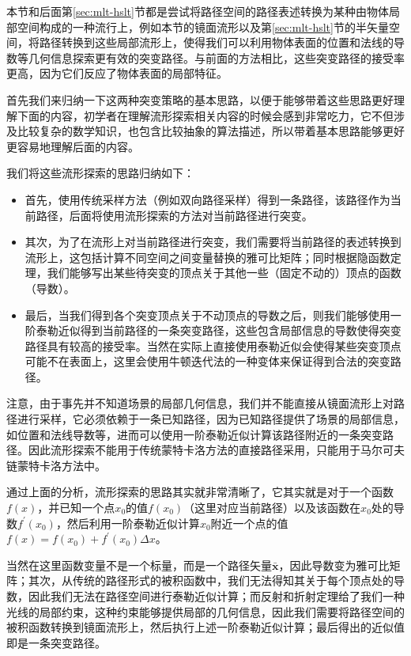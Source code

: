 本节和后面第\ref{sec:mlt-hslt}节都是尝试将路径空间的路径表述转换为某种由物体局部空间构成的一种流行上，例如本节的镜面流形以及第\ref{sec:mlt-hslt}节的半矢量空间，将路径转换到这些局部流形上，使得我们可以利用物体表面的位置和法线的导数等几何信息探索更有效的突变路径。与前面的方法相比，这些突变路径的接受率更高，因为它们反应了物体表面的局部特征。

首先我们来归纳一下这两种突变策略的基本思路，以便于能够带着这些思路更好理解下面的内容，初学者在理解流形探索相关内容的时候会感到非常吃力，它不但涉及比较复杂的数学知识，也包含比较抽象的算法描述，所以带着基本思路能够更好更容易地理解后面的内容。

我们将这些流形探索的思路归纳如下：

\begin{itemize}
	\item 首先，使用传统采样方法（例如双向路径采样）得到一条路径，该路径作为当前路径，后面将使用流形探索的方法对当前路径进行突变。
	\item 其次，为了在流形上对当前路径进行突变，我们需要将当前路径的表述转换到流形上，这包括计算不同空间之间变量替换的雅可比矩阵；同时根据隐函数定理，我们能够写出某些待突变的顶点关于其他一些（固定不动的）顶点的函数（导数）。
	\item 最后，当我们得到各个突变顶点关于不动顶点的导数之后，则我们能够使用一阶泰勒近似得到当前路径的一条突变路径，这些包含局部信息的导数使得突变路径具有较高的接受率。当然在实际上直接使用泰勒近似会使得某些突变顶点可能不在表面上，这里会使用牛顿迭代法的一种变体来保证得到合法的突变路径。
\end{itemize}

\begin{myshaded}
	注意，由于事先并不知道场景的局部几何信息，我们并不能直接从镜面流形上对路径进行采样，它必须依赖于一条已知路径，因为已知路径提供了场景的局部信息，如位置和法线导数等，进而可以使用一阶泰勒近似计算该路径附近的一条突变路径。因此流形探索不能用于传统蒙特卡洛方法的直接路径采用，只能用于马尔可夫链蒙特卡洛方法中。
\end{myshaded}

通过上面的分析，流形探索的思路其实就非常清晰了，它其实就是对于一个函数$f(x)$，并已知一个点$x_0$的值$f(x_0)$（这里对应当前路径）以及该函数在$x_0$处的导数$f^{'}(x_0)$，然后利用一阶泰勒近似计算$x_0$附近一个点的值$f(x)=f(x_0)+f^{'}(x_0)\Delta x$。

当然在这里函数变量不是一个标量，而是一个路径矢量$\bar{\mathbf{x}}$，因此导数变为雅可比矩阵；其次，从传统的路径形式的被积函数中，我们无法得知其关于每个顶点处的导数，因此我们无法在路径空间进行泰勒近似计算；而反射和折射定理给了我们一种光线的局部约束，这种约束能够提供局部的几何信息，因此我们需要将路径空间的被积函数转换到镜面流形上，然后执行上述一阶泰勒近似计算；最后得出的近似值即是一条突变路径。

